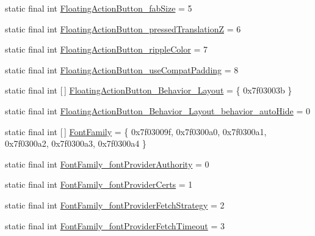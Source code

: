 \begin{DoxyCompactItemize}
\item 
static final int \mbox{\hyperlink{classandroid_1_1support_1_1design_1_1_r_1_1styleable_a6c9839a534ad6bc71d39c9655b6d8f91}{Floating\+Action\+Button\+\_\+fab\+Size}} = 5
\item 
static final int \mbox{\hyperlink{classandroid_1_1support_1_1design_1_1_r_1_1styleable_a0051f7f3dbf011baf338d3a1da28adb9}{Floating\+Action\+Button\+\_\+pressed\+TranslationZ}} = 6
\item 
static final int \mbox{\hyperlink{classandroid_1_1support_1_1design_1_1_r_1_1styleable_a321eed9129c57174a965ba1530752167}{Floating\+Action\+Button\+\_\+ripple\+Color}} = 7
\item 
static final int \mbox{\hyperlink{classandroid_1_1support_1_1design_1_1_r_1_1styleable_a5d75507e72251aaff3183114398f507c}{Floating\+Action\+Button\+\_\+use\+Compat\+Padding}} = 8
\item 
static final int \mbox{[}$\,$\mbox{]} \mbox{\hyperlink{classandroid_1_1support_1_1design_1_1_r_1_1styleable_af52e2282b9cb1275b67fa2a2c154282c}{Floating\+Action\+Button\+\_\+\+Behavior\+\_\+\+Layout}} = \{ 0x7f03003b \}
\item 
static final int \mbox{\hyperlink{classandroid_1_1support_1_1design_1_1_r_1_1styleable_a6f83019ae564bc7d5a075bd5e9c5c44d}{Floating\+Action\+Button\+\_\+\+Behavior\+\_\+\+Layout\+\_\+behavior\+\_\+auto\+Hide}} = 0
\item 
static final int \mbox{[}$\,$\mbox{]} \mbox{\hyperlink{classandroid_1_1support_1_1design_1_1_r_1_1styleable_ab347d6fcd4d1212c1dcaa6c3f6c7f597}{Font\+Family}} = \{ 0x7f03009f, 0x7f0300a0, 0x7f0300a1, 0x7f0300a2, 0x7f0300a3, 0x7f0300a4 \}
\item 
static final int \mbox{\hyperlink{classandroid_1_1support_1_1design_1_1_r_1_1styleable_ad48d6c1976cd4c19100912d9ff1a5638}{Font\+Family\+\_\+font\+Provider\+Authority}} = 0
\item 
static final int \mbox{\hyperlink{classandroid_1_1support_1_1design_1_1_r_1_1styleable_ad6dbe81ac8fcc4834009dec1b99e0657}{Font\+Family\+\_\+font\+Provider\+Certs}} = 1
\item 
static final int \mbox{\hyperlink{classandroid_1_1support_1_1design_1_1_r_1_1styleable_af9ed5f2c20dae380b2d3158640177ff2}{Font\+Family\+\_\+font\+Provider\+Fetch\+Strategy}} = 2
\item 
static final int \mbox{\hyperlink{classandroid_1_1support_1_1design_1_1_r_1_1styleable_a2ea6e17c7a04c7d06e106f3266256687}{Font\+Family\+\_\+font\+Provider\+Fetch\+Timeout}} = 3
\item 

\end{DoxyCompactItemize}
